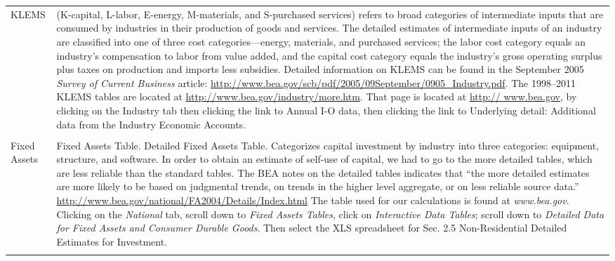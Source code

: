 \begin{table}
\begin{center}
\begin{tabular}{l @{\hspace{2em}} p{10cm}}
KLEMS &
(K-capital, L-labor, E-energy, M-materials, and S-purchased services) refers to broad categories of intermediate inputs that are consumed by industries in their production of goods and services.  The detailed estimates of intermediate inputs of an industry are classified into one of three cost categories—energy, materials, and purchased services; the labor cost category equals an industry’s compensation to labor from value added, and the capital cost category equals the industry’s gross operating surplus plus taxes on production and imports less subsidies.  Detailed information on KLEMS can be found in the September 2005 \emph{ Survey of Current Business} article: \url{http://www.bea.gov/scb/pdf/2005/09September/0905\_Industry.pdf}. The 1998--2011 KLEMS tables are located at 
\url{ http://www.bea.gov/industry/more.htm}. That page is located at \url{http:// www.bea.gov}, by clicking on the Industry tab then clicking the link to Annual I-O data, then clicking the link to Underlying detail: Additional data from the Industry Economic Accounts. \\
 & \\
Fixed Assets &  Fixed Assets Table. Detailed Fixed Assets Table. Categorizes capital investment by industry into three categories:
 equipment, structure, and software. In order to obtain an estimate of self-use of capital, 
we had to go to the more detailed tables, which are less reliable than the standard tables. 
The BEA notes on the detailed tables indicates that ``the more detailed estimates are more likely to be based on judgmental trends, on trends in the higher level aggregate, or on less reliable source data.'' \url{http://www.bea.gov/national/FA2004/Details/Index.html} 
The table used for our calculations is found at \emph{www.bea.gov}. Clicking on the \emph{National} tab, scroll down to \emph{Fixed Assets Tables}, click on \emph{Interactive Data Tables}; scroll down to \emph{Detailed Data for Fixed Assets and Consumer Durable Goods}. Then select the XLS spreadsheet for Sec. 2.5 Non-Residential Detailed Estimates for Investment.\\
& \\
    \bottomrule
  \end{tabular}

\end{center}
\label{tab:data_definitions}
\end{table}






